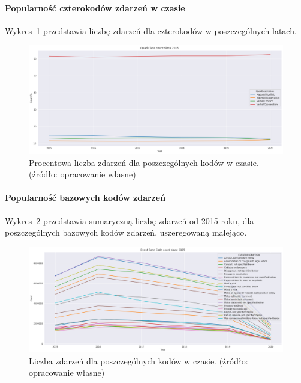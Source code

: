 \documentclass[11pt]{report}
\begin{document}
    \paragraph{Popularność czterokodów zdarzeń w czasie}
    Wykres~\ref{fig:GLOBALQCperc} przedstawia liczbę zdarzeń dla czterokodów w poszczególnych latach.
    \begin{figure}[!htp]
        \centering
        \includegraphics[width=\linewidth]{fig/GLOBAL/QCperc.png}
        \caption{Procentowa liczba zdarzeń dla poszczególnych kodów w czasie. (źródło: opracowanie własne)}
        \label{fig:GLOBALQCperc}
    \end{figure}

    \paragraph{Popularność bazowych kodów zdarzeń}
    Wykres~\ref{fig:GLOBALEBC} przedstawia sumaryczną liczbę zdarzeń od 2015 roku, dla poszczególnych bazowych kodów zdarzeń, uszeregowaną malejąco.
    \begin{figure}[!htp]
        \centering
        \includegraphics[width=\linewidth]{fig/GLOBAL/EBC.png}
        \caption{Liczba zdarzeń dla poszczególnych kodów w czasie. (źródło: opracowanie własne)}
        \label{fig:GLOBALEBC}
    \end{figure}
\end{document}
